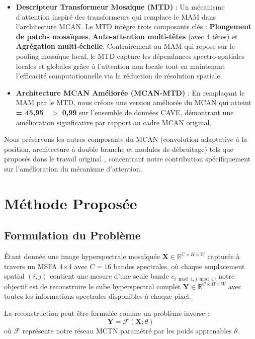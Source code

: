 \documentclass[conference]{IEEEtran}
\begin{document}
\begin{itemize}
    \item \textbf{Descripteur Transformeur Mosaïque (MTD)} : Un mécanisme d'attention inspiré des transformeurs qui remplace le MAM dans l'architecture MCAN. Le MTD intègre trois composants clés : \textbf{Plongement de patchs mosaïques}, \textbf{Auto-attention multi-têtes} (avec 4 têtes) et \textbf{Agrégation multi-échelle}. Contrairement au MAM qui repose sur le pooling mosaïque local, le MTD capture les dépendances spectro-spatiales locales et globales grâce à l'attention non locale tout en maintenant l'efficacité computationnelle via la réduction de résolution spatiale.
    
    \item \textbf{Architecture MCAN Améliorée (MCAN-MTD)} : En remplaçant le MAM par le MTD, nous créons une version améliorée du MCAN qui atteint \textbf{ = 45,95~ \quad {} \quad {} $>$ 0,99} sur l'ensemble de données CAVE, démontrant une amélioration significative par rapport au cadre MCAN original.
\end{itemize}

Nous préservons les autres composants du MCAN (convolution adaptative à la position, architecture à double branche et modules de débruitage) tels que proposés dans le travail original \cite{Feng2021}, concentrant notre contribution spécifiquement sur l'amélioration du mécanisme d'attention.

\section{Méthode Proposée}

\subsection{Formulation du Problème}

Étant donnée une image hyperspectrale mosaïquée $\mathbf{X} \in \mathbb{R}^{C \times H \times W}$ capturée à travers un MSFA 4×4 avec $C=16$ bandes spectrales, où chaque emplacement spatial $(i,j)$ contient une mesure d'une seule bande $c_{i \bmod 4, j \bmod 4}$, notre objectif est de reconstruire le cube hyperspectral complet $\mathbf{Y} \in \mathbb{R}^{C \times H \times W}$ avec toutes les informations spectrales disponibles à chaque pixel.

La reconstruction peut être formulée comme un problème inverse :
\begin{equation}
\mathbf{Y} = \mathcal{F}(\mathbf{X}; \theta)
\end{equation}
où $\mathcal{F}$ représente notre réseau MCTN paramétré par les poids apprenables $\theta$.
\end{document}
